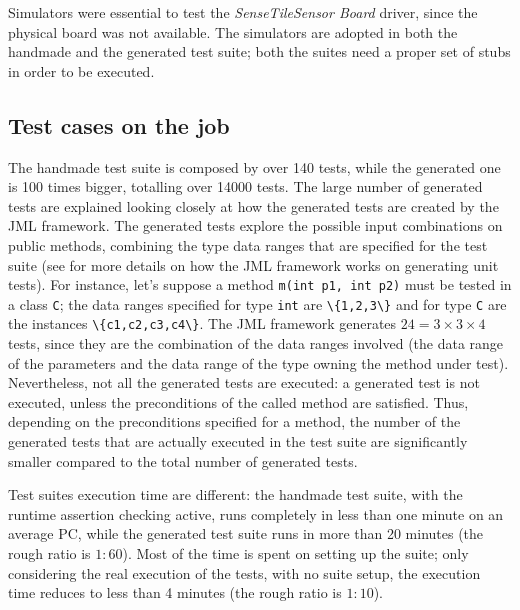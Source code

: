 \documentclass{article}
\newcommand{\lil}[1]{\texttt{\lstinline|#1|}}
\newcommand{\ST}{\emph{SenseTile}\xspace}
\newcommand{\SB}{\emph{Sensor Board}\xspace}
\newcommand{\STSB}{\ST \SB\xspace}
\begin{document}
Simulators were essential to test the \STSB driver, since the physical board was not available.
The simulators are adopted in both the handmade and the generated test suite; both the suites need a proper set of stubs in order to be executed.



\subsection{Test cases on the job}
\label{subsec:test_cases_on_the_job}

The handmade test suite is composed by over 140 tests, while the generated one is 100 times bigger, totalling over 14000 tests.
The large number of generated tests are explained looking closely at how the generated tests are created by the JML framework. 
The generated tests explore the possible input combinations on public methods, combining the type data ranges that are specified for the test suite (see \cite{Cheon-Leavens02} for more details on how the JML framework works on generating unit tests). 
For instance, let's suppose a method \lil{m(int p1, int p2)} must be tested in a class \lil{C}; the data ranges specified for type \lil{int} are \lil{\{1,2,3\}} and for type \lil{C} are the instances \lil{\{c1,c2,c3,c4\}}. 
The JML framework generates $24 = 3 \times 3 \times 4$ tests, since they are the combination of the data ranges involved (the data range of the parameters and the data range of the type owning the method under test). 
Nevertheless, not all the generated tests are executed: a generated test is not executed, unless the preconditions of the called method are satisfied. 
Thus, depending on the preconditions specified for a method, the number of the generated tests that are actually executed in the test suite are significantly smaller compared to the total number of generated tests.

Test suites execution time are different: the handmade test suite, with the runtime assertion checking active, runs completely in less than one minute on an average PC, while the generated test suite runs in more than 20 minutes (the rough ratio is $ 1 : 60 $). 
Most of the time is spent on setting up the suite; only considering the real execution of the tests, with no suite setup, the execution time reduces to less than 4 minutes (the rough ratio is $ 1 : 10 $).
\end{document}
